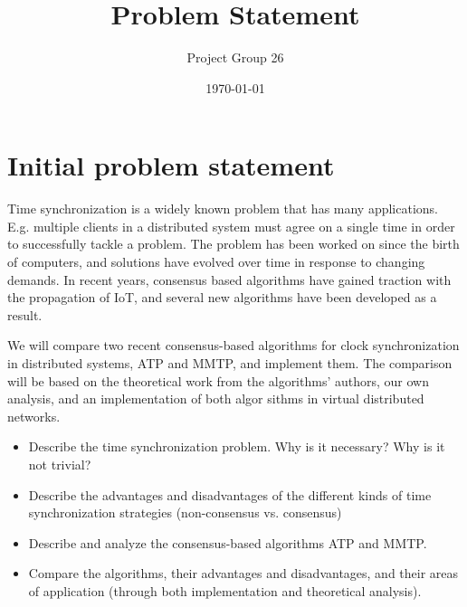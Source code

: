 \documentclass{article}
\title{Problem Statement}
\author{Project Group 26}
\date{\today}
\begin{document}
\maketitle

\section{Initial problem statement}

Time synchronization is a widely known problem that has many applications. E.g. multiple clients in a distributed system must agree on a single time in order to successfully tackle a problem. The problem has been worked on since the birth of computers, and solutions have evolved over time in response to changing demands. In recent years, consensus based algorithms have gained traction with the propagation of IoT, and several new algorithms have been developed as a result.

We will compare two recent consensus-based algorithms for clock synchronization in distributed systems, ATP and MMTP, and implement them. The comparison will be based on the theoretical work from the algorithms' authors, our own analysis, and an implementation of both algor
sithms in virtual distributed networks.

\begin{itemize}
    \item Describe the time synchronization problem. Why is it necessary? Why is it not trivial? 
    \item Describe the advantages and disadvantages of the different kinds of time synchronization strategies (non-consensus vs. consensus)
    \item Describe and analyze the consensus-based algorithms ATP and MMTP.
    \item Compare the algorithms, their advantages and disadvantages, and their areas of application (through both implementation and theoretical analysis).
\end{itemize}
\end{document}
